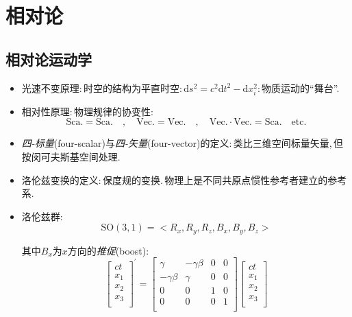 \chapter{相对论}


\section{相对论运动学}

\begin{itemize}
\item 光速不变原理:\,时空的结构为平直时空:\,$\text{d}s^2=c^2\text{d}t^2-\text{d}x_i^2$:\,物质运动的``舞台''.

\item 相对性原理:\,物理规律的协变性:
\[\text{Sca}.=\text{Sca}. \quad , \quad \text{Vec}.=\text{Vec}. \quad ,\quad  \text{Vec}.\cdot \text{Vec}.=\text{Sca}. \quad \text{etc}.\]

\item \emph{四-标量}(four-scalar)与\emph{四-矢量}(four-vector)的定义:\,类比三维空间标量矢量,\,但按闵可夫斯基空间处理.

\item 洛伦兹变换的定义:\,保度规的变换.\,物理上是不同共原点惯性参考者建立的参考系.

\item 洛伦兹群:
\[\text{SO}\left( 3,1 \right) =<R_x, R_y, R_z, B_x, B_y, B_z>\]

其中$B_x$为$x$方向的\emph{推促}(boost):
\[\left[ \begin{array}{c}
	ct\\
	x_1\\
	x_2\\
	x_3\\
\end{array} \right] ^{'} =\left[ \begin{matrix}
	\gamma&		-\gamma \beta&		0&		0\\
	-\gamma \beta&		\gamma&		0&		0\\
	0&		0&		1&		0\\
	0&		0&		0&		1\\
\end{matrix} \right] \left[ \begin{array}{c}
	ct\\
	x_1\\
	x_2\\
	x_3\\
\end{array} \right] \]


\end{itemize}
